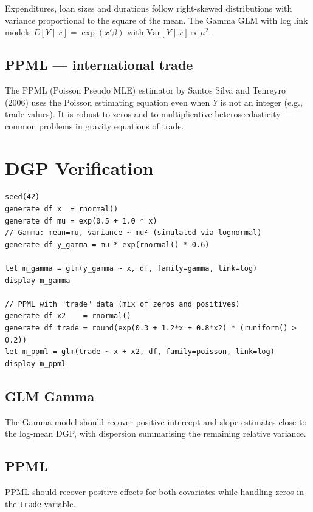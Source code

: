 Expenditures, loan sizes and durations follow right-skewed distributions
with variance proportional to the square of the mean. The Gamma GLM with
log link models $E[Y \mid x] = \exp(x'\beta)$ with $\mathrm{Var}[Y\mid x] \propto \mu^2$.

\subsection*{PPML — international trade}

The PPML (Poisson Pseudo MLE) estimator by Santos Silva and Tenreyro (2006) uses
the Poisson estimating equation even when $Y$ is not an integer (e.g., trade values).
It is robust to zeros and to multiplicative heteroscedasticity —
common problems in gravity equations of trade.

\section{DGP Verification}

\begin{lstlisting}[caption={GLM Gamma and PPML}]
seed(42)
generate df x  = rnormal()
generate df mu = exp(0.5 + 1.0 * x)
// Gamma: mean=mu, variance ~ mu² (simulated via lognormal)
generate df y_gamma = mu * exp(rnormal() * 0.6)

let m_gamma = glm(y_gamma ~ x, df, family=gamma, link=log)
display m_gamma

// PPML with "trade" data (mix of zeros and positives)
generate df x2    = rnormal()
generate df trade = round(exp(0.3 + 1.2*x + 0.8*x2) * (runiform() > 0.2))
let m_ppml = glm(trade ~ x + x2, df, family=poisson, link=log)
display m_ppml
\end{lstlisting}

\subsection*{GLM Gamma}

The Gamma model should recover positive intercept and slope estimates close to
the log-mean DGP, with dispersion summarising the remaining relative variance.

\subsection*{PPML}

PPML should recover positive effects for both covariates while handling zeros
in the \texttt{trade} variable.

